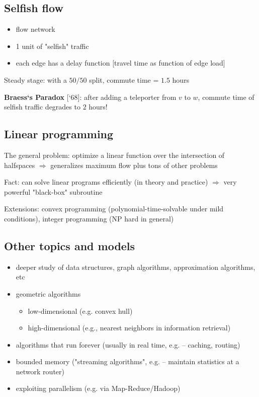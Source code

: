 \documentclass[a4paper,12pt]{article}
\theoremstyle{plain}
\theoremstyle{definition}
\theoremstyle{remark}
\begin{document}
\subsection{Selfish flow}
\begin{itemize}
	\item flow network
	\item 1 unit of "selfish" traffic
	\item each edge has a delay function [travel time as function of edge load]
\end{itemize}

Steady stage: with a $50/50$ split, commute time = $1.5$ hours

\textbf{Braess`s Paradox} [`68]: after adding a teleporter from $v$ to $w$, commute time of selfish traffic degrades to $2$ hours!



\subsection{Linear programming}
The general problem: optimize a linear function over the intersection of halfspaces $\Rightarrow$ generalizes maximum flow plus tons of other problems

Fact: can solve linear programs efficiently (in theory and practice) $\Rightarrow$ very powerful "black-box" subroutine

Extensions: convex programming (polynomial-time-solvable under mild conditions), integer programming (NP hard in general)



\subsection{Other topics and models}
\begin{itemize}
	\item deeper study of data structures, graph algorithms, approximation algorithms, etc
	\item geometric algorithms
	\begin{itemize}
		\item low-dimensional (e.g. convex hull)
		\item high-dimensional (e.g., nearest neighbors in information retrieval)
	\end{itemize}
	\item algorithms that run forever (usually in real time, e.g. -- caching, routing)
	\item bounded memory ("streaming algorithms", e.g. -- maintain statistics at a network router)
	\item exploiting parallelism (e.g. via Map-Reduce/Hadoop)
\end{itemize}
\end{document}
